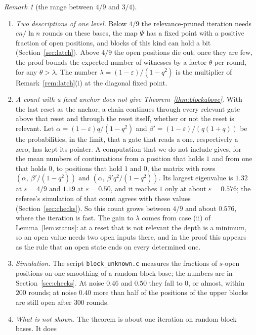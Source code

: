 \documentclass[11pt]{amsart}
\theoremstyle{definition}
\theoremstyle{remark}
\newtheorem{remark}[theorem]{Remark}
\newcommand{\eps}{\varepsilon}
\begin{document}
\begin{remark}[the range between $4/9$ and $3/4$]\label{rem:above}
\begin{enumerate}[label=(\roman*),leftmargin=2.4em]
\item \emph{Two descriptions of one level.} Below $4/9$ the relevance-pruned iteration needs
$cn/\ln n$ rounds on these bases, the map $\Psi$ has a fixed point with a positive fraction of
open positions, and blocks of this kind can hold a bit (Section~\ref{sec:latch}). Above $4/9$
the open positions die out; once they are few, the proof bounds the expected number of witnesses
by a factor $\theta$ per round, for any $\theta>\lambda$. The number
$\lambda=(1-\eps)/(1-q^2)$ is the multiplier of Remark~\ref{rem:latch}(i) at the diagonal fixed
point.
\item \emph{A count with a fixed anchor does not give Theorem~\ref{thm:blockabove}.} With the
last reset as the anchor, a chain continues through every relevant gate above that reset and
through the reset itself, whether or not the reset is relevant. Let $\alpha=(1-\eps)q/(1-q^2)$
and $\beta'=(1-\eps)/(q(1+q))$ be the probabilities, in the limit, that a gate that reads a one,
respectively a zero, has kept its pointer. A computation that we do not include gives, for the
mean numbers of continuations from a position that holds $1$ and from one that holds $0$, to
positions that hold $1$ and $0$, the matrix with rows $(\alpha,\ \beta'/(1-q^2))$ and
$(\alpha,\ \beta'q^2/(1-q^2))$. Its largest eigenvalue is $1.32$ at $\eps=4/9$ and $1.19$ at
$\eps=0.50$, and it reaches $1$ only at about $\eps=0.576$; the referee's simulation of that
count agrees with these values (Section~\ref{sec:checks}). So this count grows between $4/9$ and
about $0.576$, where the iteration is fast. The gain to $\lambda$ comes from case (ii) of
Lemma~\ref{lem:status}: at a reset that is not relevant the depth is a minimum, so an open value
needs two open inputs there, and in the proof this appears as the rule that an open state ends on
every determined one.
\item \emph{Simulation.} The script \texttt{block\_unknown.c} measures the fractions of $s$-open
positions on one smoothing of a random block base; the numbers are in Section~\ref{sec:checks}.
At noise $0.46$ and $0.50$ they fall to $0$, or almost, within $200$ rounds; at noise $0.40$ more
than half of the positions of the upper blocks are still open after $300$ rounds.
\item \emph{What is not shown.} The theorem is about one iteration on random block bases. It does

\end{enumerate}
\end{remark}
\end{document}
